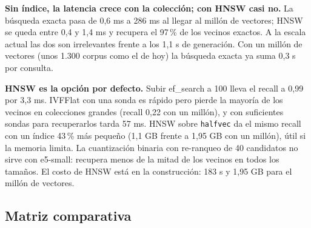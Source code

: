 \documentclass[11pt,letterpaper]{article}
\newcommand{\cod}[1]{\texttt{\small #1}}
\begin{document}
\textbf{Sin índice, la latencia crece con la colección; con HNSW casi no.} La búsqueda exacta pasa de 0,6 ms a 286 ms al llegar al millón de vectores; HNSW se queda entre 0,4 y 1,4 ms y recupera el 97\,\% de los vecinos exactos. A la escala actual las dos son irrelevantes frente a los 1,1 s de generación. Con un millón de vectores (unos 1.300 corpus como el de hoy) la búsqueda exacta ya suma 0,3 s por consulta.

\textbf{HNSW es la opción por defecto.} Subir ef\_search a 100 lleva el recall a 0,99 por 3,3 ms. IVFFlat con una sonda es rápido pero pierde la mayoría de los vecinos en colecciones grandes (recall 0,22 con un millón), y con suficientes sondas para recuperarlos tarda 57 ms. HNSW sobre \cod{halfvec} da el mismo recall con un índice 43\,\% más pequeño (1,1 GB frente a 1,95 GB con un millón), útil si la memoria limita. La cuantización binaria con re-ranqueo de 40 candidatos no sirve con e5-small: recupera menos de la mitad de los vecinos en todos los tamaños. El costo de HNSW está en la construcción: 183 s y 1,95 GB para el millón de vectores.

\subsection{Matriz comparativa}
\end{document}
